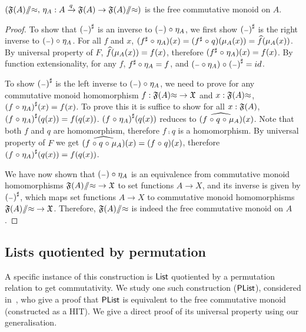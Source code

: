 \begin{propositionrep}
    \label{prop:qfreemon}
    \leavevmode
    $({\mathfrak{F}(A)}{\sslash}{\approx},\, \eta_A : A \xrightarrow{q} \mathfrak{F}(A) \to {\mathfrak{F}(A)}{\sslash}{\approx})$
    is the free commutative monoid on $A$.
\end{propositionrep}
\begin{proof}
    To show that $\ext{(\blank)}$ is an inverse to $(\blank) \comp \eta_A$,
    we first show $\ext{(\blank)}$ is the right inverse to $(\blank) \comp \eta_A$.
    For all $f$ and $x$, $({f}^{\sharp} \mathrel{\circ} \eta_A)(x) = ({f}^{\sharp} \mathrel{\circ} q)(\mu_A(x)) = \widehat{f}(\mu_A(x))$.
    By universal property of $F$, $\widehat{f}(\mu_A(x)) = f(x)$, therefore $({f}^{\sharp} \mathrel{\circ} \eta_A)(x) = f(x)$.
    By function extensionality, for any $f$, ${f}^{\sharp} \circ \eta_A = f$,
    and $(\blank \circ \eta_A) \comp \ext{(\blank)} = id$.

    To show $\ext{(\blank)}$ is the left inverse to $(\blank) \comp \eta_A$, we need to prove
    for any commutative monoid homomorphism $f : {\mathfrak{F}(A)}{\approx} \to \mathfrak{X}$ and $x : {\mathfrak{F}(A)}{\approx}$,
    ${(f \mathrel{\circ} \eta_A)}^{\sharp}(x) = f(x)$. To prove this it is suffice to show for all $x : \mathfrak{F}(A)$,
    ${(f \mathrel{\circ} \eta_A)}^{\sharp}(q(x)) = f(q(x))$.
    ${(f \mathrel{\circ} \eta_A)}^{\sharp}(q(x))$ reduces to $\widehat{(f \mathrel{\circ} q \mathrel{\circ} \mu_A)}(x)$.
    Note that both $f$ and $q$ are homomorphism, therefore $f \comp q$ is a homomorphism. By
    universal property of $F$ we get $\widehat{(f \mathrel{\circ} q \mathrel{\circ} \mu_A)}(x) = (f \mathrel{\circ} q)(x)$,
    therefore ${(f \mathrel{\circ} \eta_A)}^{\sharp}(q(x)) = f(q(x))$.

    We have now shown that $(\blank) \comp \eta_A$ is an equivalence from
    commutative monoid homomorphisms ${\mathfrak{F}(A)}{\sslash}{\approx} \to \mathfrak{X}$
    to set functions $A \to X$, and its inverse is given by $\ext{(\blank)}$, which maps set
    functions $A \to X$ to commutative monoid homomorphisms ${\mathfrak{F}(A)}{\sslash}{\approx} \to \mathfrak{X}$.
    Therefore, ${\mathfrak{F}(A)}{\sslash}{\approx}$ is indeed the free commutative monoid on $A$.
\end{proof}


\subsection{Lists quotiented by permutation}\label{cmon:plist}

A specific instance of this construction is $\operatorname{\mathsf{List}}$ quotiented by a permutation relation to get commutativity.
We study one such construction ($\operatorname{\mathsf{PList}}$), considered in~\cite{joramConstructiveFinalSemantics2023},
who give a proof that $\operatorname{\mathsf{PList}}$ is equivalent to the free commutative monoid (constructed as a HIT).
We give a direct proof of its universal property using our generalisation.

